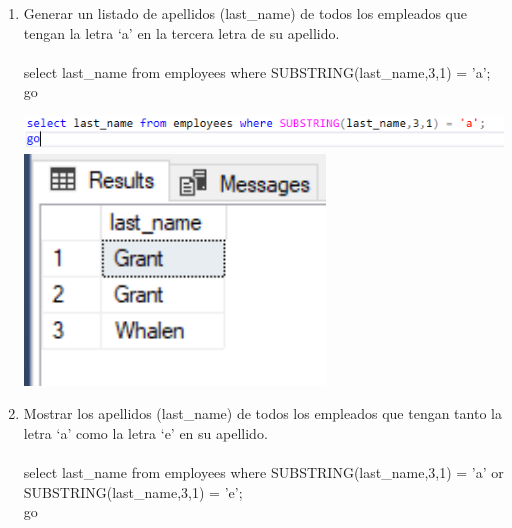 \begin{enumerate}[1.]
	\item Generar un listado de apellidos (last\_name) de todos los empleados que tengan la letra ‘a’ en la tercera letra de su apellido.
	\\ \\select last\_name from employees where SUBSTRING(last\_name,3,1) = 'a';
	\\go

	\begin{center}
	\includegraphics[width=17cm]{./Imagenes/actividad_04_12a} 
	\includegraphics[width=8cm]{./Imagenes/actividad_04_12} 
	\end{center}

	\item Mostrar los apellidos (last\_name) de todos los empleados que tengan tanto la letra ‘a’ como la letra ‘e’ en su apellido.
	\\ \\select last\_name from employees where SUBSTRING(last\_name,3,1) = 'a' or SUBSTRING(last\_name,3,1) = 'e';
	\\go


\end{enumerate}
